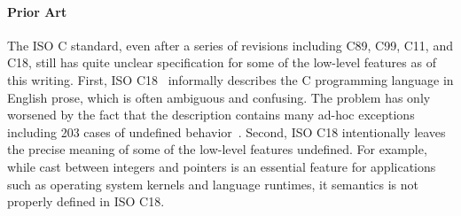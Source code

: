 












\paragraph{Prior Art}

The ISO C standard, even after a series of revisions including C89, C99, C11, and C18, still has
quite unclear specification for some of the low-level features as of this writing.  First, ISO
C18~\cite{c18} informally describes the C programming language in English prose, which is often
ambiguous and confusing.  The problem has only worsened by the fact that the description contains
many ad-hoc exceptions including 203 cases of undefined behavior~\cite[J.2]{c18}.  Second, ISO C18
intentionally leaves the precise meaning of some of the low-level features undefined.  For example,
while cast between integers and pointers is an essential feature for applications such as operating
system kernels and language runtimes, it semantics is not properly defined in ISO C18.

